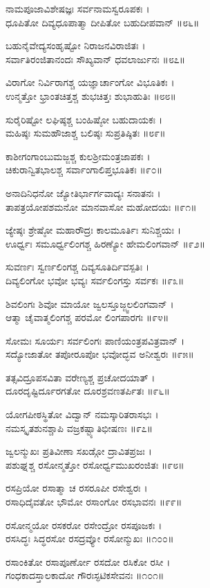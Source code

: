 ನಾಮಪೂಜಾವಿಶೇಷಜ್ಞಃ ಸರ್ವನಾಮಸ್ವರೂಪಕಃ ।\\
ಧೂಪಿತೋ ದಿವ್ಯಧೂಪಾತ್ಮಾ ದೀಪಿತೋ ಬಹುದೀಪವಾನ್ ॥೮೬॥

ಬಹುನೈವೇದ್ಯಸಂಹೃಷ್ಟೋ ನಿರಾಜನವಿರಾಜಿತಃ ।\\
ಸರ್ವಾತಿರಂಜಿತಾನಂದಃ ಸೌಖ್ಯವಾನ್ ಧವಲಾರ್ಜುನಃ ॥೮೭॥

ವಿರಾಗೋ ನಿರ್ವಿರಾಗಶ್ಚ ಯಜ್ಞಾರ್ಚಾಂಗೋ ವಿಭೂತಿಕಃ ।\\
ಉನ್ಮತ್ತೋ ಭ್ರಾಂತಚಿತ್ತಶ್ಚ ಶುಭಚಿತ್ತಃ ಶುಭಾಹುತಿಃ ॥೮೮॥

ಸುರೈರಿಷ್ಟೋ ಲಘಿಷ್ಠಶ್ಚ ಬಂಹಿಷ್ಠೋ ಬಹುದಾಯಕಃ ।\\
ಮಹಿಷ್ಠಃ ಸುಮಹೌಜಾಶ್ಚ ಬಲಿಷ್ಠಃ ಸುಪ್ರತಿಷ್ಠಿತಃ ॥೮೯॥

ಕಾಶೀಗಂಗಾಂಬುಮಜ್ಜಶ್ಚ ಕುಲಶ್ರೀಮಂತ್ರಜಾಪಕಃ ।\\
ಚಿಕುರಾನ್ವಿತಭಾಲಶ್ಚ ಸರ್ವಾಂಗಾಲಿಪ್ತಭೂತಿಕಃ ॥೯೦॥

ಅನಾದಿನಿಧನೋ ಜ್ಯೋತಿರ್ಭಾರ್ಗವಾದ್ಯಃ ಸನಾತನಃ ।\\
ತಾಪತ್ರಯೋಪಶಮನೋ ಮಾನವಾಸೋ ಮಹೋದಯಃ ॥೯೧॥

ಜ್ಯೇಷ್ಠಃ ಶ್ರೇಷ್ಠೋ ಮಹಾರೌದ್ರಃ ಕಾಲಮೂರ್ತಿಃ ಸುನಿಶ್ಚಯಃ ।\\
ಊರ್ಧ್ವಃ ಸಮೂರ್ಧ್ವಲಿಂಗಶ್ಚ ಹಿರಣ್ಯೋ ಹೇಮಲಿಂಗವಾನ್ ॥೯೨॥

ಸುವರ್ಣಃ ಸ್ವರ್ಣಲಿಂಗಶ್ಚ ದಿವ್ಯಸೂತಿರ್ದಿವಸ್ಪತಿಃ ।\\
ದಿವ್ಯಲಿಂಗೋ ಭವೋ ಭವ್ಯಃ ಸರ್ವಲಿಂಗಸ್ತು ಸರ್ವಕಃ ॥೯೩॥

ಶಿವಲಿಂಗಃ ಶಿವೋ ಮಾಯೋ ಜ್ವಲಸ್ತೂಜ್ಜ್ವಲಲಿಂಗವಾನ್ ।\\
ಆತ್ಮಾ ಚೈವಾತ್ಮಲಿಂಗಶ್ಚ ಪರಮೋ ಲಿಂಗಪಾರಗಃ ॥೯೪॥

ಸೋಮಃ ಸೂರ್ಯಃ ಸರ್ವಲಿಂಗಃ ಪಾಣಿಯಂತ್ರಪವಿತ್ರವಾನ್ ।\\
ಸದ್ಯೋಜಾತೋ ತಪೋರೂಪೋ ಭವೋದ್ಭವ ಅನೀಶ್ವರಃ ॥೯೫॥

ತತ್ಸವಿದ್ರೂಪಸವಿತಾ ವರೇಣ್ಯಶ್ಚ ಪ್ರಚೋದಯಾತ್ ।\\
ದೂರದೃಷ್ಟಿರ್ದೂರಗತೋ ದೂರಶ್ರವಣತರ್ಪಿತಃ ॥೯೬॥

ಯೋಗಪೀಠಸ್ಥಿತೋ ವಿದ್ವಾನ್ ನಮಸ್ಕಾರಿತರಾಸಭಃ ।\\
ನಮಸ್ಕೃತಶುನಶ್ಚಾಪಿ ವಜ್ರಕಷ್ಟ್ಯಾತಿಭೀಷಣಃ ॥೯೭॥

ಜ್ವಲನ್ಮುಖಃ ಪ್ರತಿವೀಣಾ ಸಖಡ್ಗೋ ದ್ರಾವಿತಪ್ರಜಃ ।\\
ಪಶುಘ್ನಶ್ಚ ರಸೋನ್ಮತ್ತೋ ರಸೋರ್ಧ್ವಮುಖರಂಜಿತಃ ॥೯೮॥

ರಸಪ್ರಿಯೋ ರಸಾತ್ಮಾ ಚ ರಸರೂಪೀ ರಸೇಶ್ವರಃ ।\\
ರಸಾಧಿದೈವತೋ ಭೌಮೋ ರಸಾಂಗೋ ರಸಭಾವನಃ ॥೯೯॥

ರಸೋನ್ಮಯೋ ರಸಕರೋ ರಸೇಂದ್ರೋ ರಸಪೂಜಕಃ ।\\
ರಸಸಿದ್ಧಃ ಸಿದ್ಧರಸೋ ರಸದ್ರವ್ಯೋ ರಸೋನ್ಮುಖಃ ॥೧೦೦॥

ರಸಾಂಕಿತೋ ರಸಾಪೂರ್ಣೋ ರಸದೋ ರಸಿಕೋ ರಸೀ ।\\
ಗಂಧಕಾದಸ್ತಾಲಕಾದೋ ಗೌರಃಸ್ಫಟಿಕಸೇವನಃ ॥೧೦೧॥

